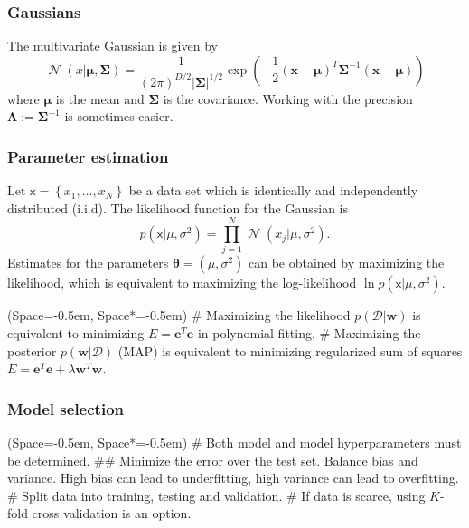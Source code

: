 \documentclass[12pt, a4paper]{article}
\newcommand{\listSpace}{-0.5em}%
\newcommand{\D}{\mathcal{D}}
\renewcommand{\sf}[1]{\mathsf{#1}}
\newcommand{\vect}[1]{\bm{#1}}
\newcommand{\abs}[1]{\left\lvert#1\right\rvert}
\DeclareMathOperator{\N}{\mathcal{N}}
\begin{document}
\subsubsection*{Gaussians}
The multivariate Gaussian is given by
\begin{equation*}
\N\left(x | \vect{\mu}, \vect{\Sigma}\right) = 
\frac{1}{(2\pi)^{D/2} \abs{\vect{\Sigma}}^{1/2}}  
\exp\left( - \frac{1}{2} 
(\vect{x} - \vect{\mu})^T
\vect{\Sigma}^{-1}
(\vect{x} - \vect{\mu})
\right)
\end{equation*}
where $\vect{\mu}$ is the mean and $\vect{\Sigma}$ is the covariance.
Working with the precision $\vect{\Lambda} := \vect{\Sigma}^{-1}$ is sometimes easier.

\subsubsection*{Parameter estimation}
Let $\sf{x} = \left\{x_1, \dots, x_N\right\}$ be a data set which is identically and independently distributed (i.i.d). 
The likelihood function for the Gaussian is
\begin{equation*}
p\left(\sf{x} | \mu, \sigma^2 \right) = 
\prod_{j = 1}^{N} \N \left(x_j | \mu, \sigma^2\right).
\end{equation*}
Estimates for the parameters $\vect{\theta} = (\mu, \sigma^2)$ can be obtained by maximizing the likelihood, which is equivalent to maximizing the log-likelihood $\ln p\left(\sf{x} | \mu, \sigma^2 \right)$.
\begin{easylist}[itemize]
	\ListProperties(Space=\listSpace, Space*=\listSpace)
	# Maximizing the likelihood $p(\D | \vect{w})$ is equivalent to minimizing $E = \vect{e}^T\vect{e}$ in polynomial fitting.
	# Maximizing the posterior $p(\vect{w} | \D)$ (MAP) is equivalent to minimizing regularized sum of squares $E = \vect{e}^T\vect{e} + \lambda \vect{w}^T \vect{w}$.
\end{easylist}


\subsubsection*{Model selection}
\begin{easylist}[itemize]
	\ListProperties(Space=\listSpace, Space*=\listSpace)
	# Both model and model hyperparameters must be determined.
	## Minimize the error over the test set. 
	Balance bias and variance. 
	High bias can lead to underfitting,
	high variance can lead to overfitting.
	# Split data into training, testing and validation.
	# If data is scarce, using $K$-fold cross validation is an option.
\end{easylist}
\end{document}
